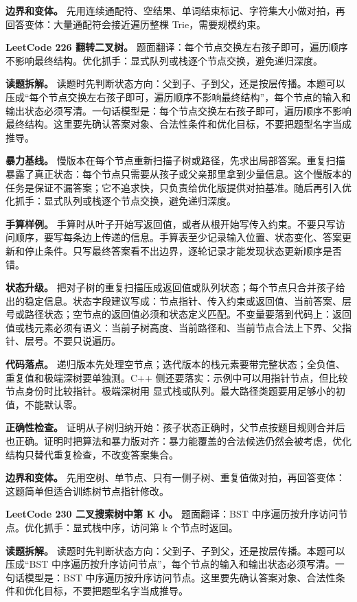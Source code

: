 \textbf{边界和变体。} 先用连续通配符、空结果、单词结束标记、字符集大小做对拍，再回答变体：大量通配符会接近遍历整棵 Trie，需要规模约束。

\noindent\textbf{LeetCode 226 翻转二叉树。} 题面翻译：每个节点交换左右孩子即可，遍历顺序不影响最终结构。优化抓手：显式队列或栈逐个节点交换，避免递归深度。

\textbf{读题拆解。} 读题时先判断状态方向：父到子、子到父，还是按层传播。本题可以压成“每个节点交换左右孩子即可，遍历顺序不影响最终结构”，每个节点的输入和输出状态必须写清。一句话模型是：每个节点交换左右孩子即可，遍历顺序不影响最终结构。这里要先确认答案对象、合法性条件和优化目标，不要把题型名字当成推导。

\textbf{暴力基线。} 慢版本在每个节点重新扫描子树或路径，先求出局部答案。重复扫描暴露了真正状态：每个节点只需要从孩子或父亲那里拿到少量信息。这个慢版本的任务是保证不漏答案；它不追求快，只负责给优化版提供对拍基准。随后再引入优化抓手：显式队列或栈逐个节点交换，避免递归深度。

\textbf{手算样例。} 手算时从叶子开始写返回值，或者从根开始写传入约束。不要只写访问顺序，要写每条边上传递的信息。手算表至少记录输入位置、状态变化、答案更新和停止条件。只写最终答案看不出边界，逐轮记录才能发现状态更新顺序是否错。

\textbf{状态升级。} 把对子树的重复扫描压成返回值或队列状态；每个节点只合并孩子给出的稳定信息。状态字段建议写成：节点指针、传入约束或返回值、当前答案、层号或路径状态；空节点的返回值必须和状态定义匹配。不变量要落到代码上：返回值或栈元素必须有语义：当前子树高度、当前路径和、当前节点合法上下界、父指针、层号。不要只说遍历。

\textbf{代码落点。} 递归版本先处理空节点；迭代版本的栈元素要带完整状态；全负值、重复值和极端深树要单独测。C++ 侧还要落实：示例中可以用指针节点，但比较节点身份时比较指针。极端深树用  显式栈或队列。最大路径类题要用足够小的初值，不能默认零。

\textbf{正确性检查。} 证明从子树归纳开始：孩子状态正确时，父节点按题目规则合并后也正确。证明时把算法和暴力版对齐：暴力能覆盖的合法候选仍然会被考虑，优化结构只替代重复检查，不改变答案集合。

\textbf{边界和变体。} 先用空树、单节点、只有一侧子树、重复值做对拍，再回答变体：这题简单但适合训练树节点指针修改。

\noindent\textbf{LeetCode 230 二叉搜索树中第 K 小。} 题面翻译：BST 中序遍历按升序访问节点。优化抓手：显式栈中序，访问第 k 个节点时返回。

\textbf{读题拆解。} 读题时先判断状态方向：父到子、子到父，还是按层传播。本题可以压成“BST 中序遍历按升序访问节点”，每个节点的输入和输出状态必须写清。一句话模型是：BST 中序遍历按升序访问节点。这里要先确认答案对象、合法性条件和优化目标，不要把题型名字当成推导。

